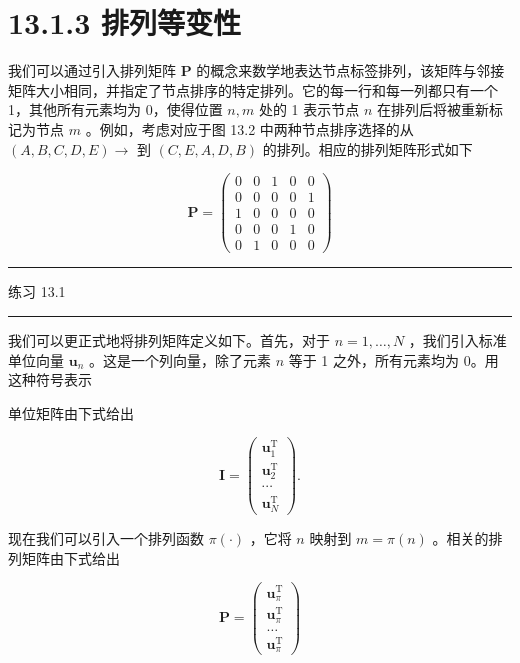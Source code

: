 \documentclass[10pt]{report}
\newcommand{\HRule}{\begin{center}\rule{0.9\linewidth}{0.2mm}\end{center}}
\begin{document}
\section*{13.1.3 排列等变性}

我们可以通过引入排列矩阵 \(\mathbf{P}\) 的概念来数学地表达节点标签排列，该矩阵与邻接矩阵大小相同，并指定了节点排序的特定排列。它的每一行和每一列都只有一个 1，其他所有元素均为 0，使得位置 \(n,m\) 处的 1 表示节点 \(n\) 在排列后将被重新标记为节点 \(m\) 。例如，考虑对应于图 13.2 中两种节点排序选择的从 \(\left( {A,B,C,D,E}\right)  \rightarrow\) 到 \(\left( {C,E,A,D,B}\right)\) 的排列。相应的排列矩阵形式如下

\[
\mathbf{P} = \left( \begin{array}{lllll} 0 & 0 & 1 & 0 & 0 \\  0 & 0 & 0 & 0 & 1 \\  1 & 0 & 0 & 0 & 0 \\  0 & 0 & 0 & 1 & 0 \\  0 & 1 & 0 & 0 & 0 \end{array}\right)  \tag{13.1}
\]

\HRule

练习 13.1

\HRule

我们可以更正式地将排列矩阵定义如下。首先，对于 \(n = 1,\ldots ,N\) ，我们引入标准单位向量 \({\mathbf{u}}_{n}\) 。这是一个列向量，除了元素 \(n\) 等于 1 之外，所有元素均为 0。用这种符号表示

单位矩阵由下式给出

\[
\mathbf{I} = \left( \begin{matrix} {\mathbf{u}}_{1}^{\mathrm{T}} \\  {\mathbf{u}}_{2}^{\mathrm{T}} \\  \cdots \\  {\mathbf{u}}_{N}^{\mathrm{T}} \end{matrix}\right) . \tag{13.2}
\]

现在我们可以引入一个排列函数 \(\pi \left( \cdot \right)\) ，它将 \(n\) 映射到 \(m = \pi \left( n\right)\) 。相关的排列矩阵由下式给出

\[
\mathbf{P} = \left( \begin{matrix} {\mathbf{u}}_{\pi }^{\mathrm{T}} \\  {\mathbf{u}}_{\pi }^{\mathrm{T}} \\  \ldots \\  {\mathbf{u}}_{\pi }^{\mathrm{T}} \end{matrix}\right)  \tag{13.3}
\]
\end{document}
